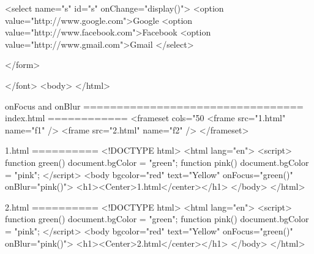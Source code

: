 	   <select name="s" id="s" onChange="display()">
	      <option value="http://www.google.com">Google
		  <option value="http://www.facebook.com">Facebook
		  <option value="http://www.gmail.com">Gmail
	   </select>
	  
	</form>
	
   </font>
  <body>
</html>

onFocus and onBlur
=================================
index.html
============
<frameset cols="50%
  <frame src="1.html" name="f1" />
  <frame src="2.html" name="f2" />
</frameset>

1.html
==========
<!DOCTYPE html>
<html lang="en">
  <script>
    function green(){
		document.bgColor = "green";
	}
	function pink(){
		document.bgColor = "pink";
	}
  </script>
 <body bgcolor="red" text="Yellow" onFocus="green()" onBlur="pink()">
  <h1><Center>1.html</center></h1>
 </body>
</html>

2.html
==========
<!DOCTYPE html>
<html lang="en">
 <script>
    function green(){
		document.bgColor = "green";
	}
	function pink(){
		document.bgColor = "pink";
	}
  </script>
 <body bgcolor="red" text="Yellow" onFocus="green()" onBlur="pink()">
  <h1><Center>2.html</center></h1>
 </body>
</html>


